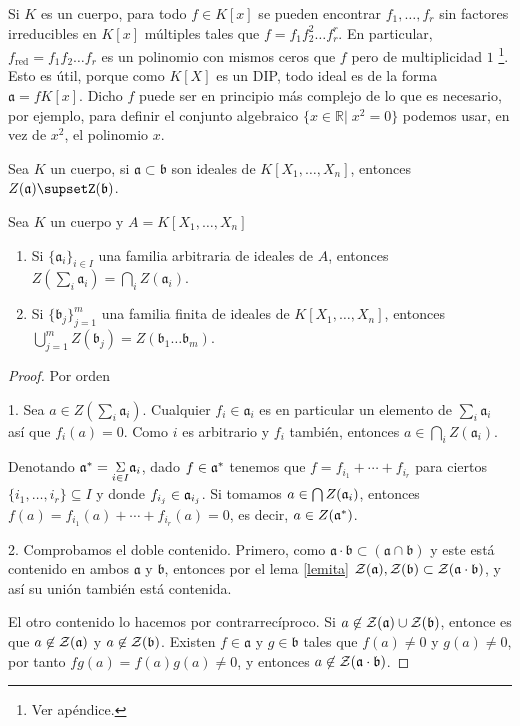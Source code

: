 \documentclass[./main.tex]{subfiles}
\begin{document}
Si $K$ es un cuerpo, para todo $f\in K[x]$ se pueden encontrar $f_1,\dots, f_r$ sin factores irreducibles en $K[x]$ múltiples tales que $f = f_1 f_2^2 \dots f_r^r$. En particular, $f_{\operatorname{red}} = f_1f_2 \dots f_r$ es un polinomio con mismos ceros que $f$ pero de multiplicidad $1$ \footnote{Ver apéndice.}. Esto es útil, porque como $K[X]$ es un DIP, todo ideal es de la forma $\mathfrak a = f K[x] $. Dicho $f$ puede ser en principio más complejo de lo que es necesario, por ejemplo, para definir el conjunto algebraico $\{x \in \mathbb R \vert \; x^2 = 0 \}$ podemos usar, en vez de $x^2$, el polinomio $x$.

\begin{lemma} \label{lemita}
Sea $K$ un cuerpo, si $\mathfrak{a}\subset \mathfrak b$ son ideales de $K[X_1,\dots, X_n]$, entonces $Z(\mathfrak{a}) \supsetZ (\mathfrak b)$.
\end{lemma}

\begin{proposition}
Sea $K$ un cuerpo y $A = K[X_1,\dots , X_n]$
\begin{enumerate}
    \item Si $\{\mathfrak a_i\}_{i\in I}$ una familia arbitraria de ideales de $A$, entonces $Z(\sum_i \mathfrak a_i) = \bigcap_i Z(\mathfrak a_i)$.
    \item Si $\{\mathfrak b_j\}_{j = 1}^m$ una familia finita de ideales de $K[X_1,\dots , X_n]$, entonces $\bigcup_{j=1}^m Z(\mathfrak b_j) = Z(\mathfrak b_1 \dots \mathfrak b_m)$.
\end{enumerate}
\end{proposition}
\begin{proof}
Por orden

1. Sea $a\in Z(\sum_i \mathfrak a_i)$. Cualquier $f_i \in \mathfrak a_i$ es en particular un elemento de $\sum_i \mathfrak a_i$ así que $f_i(a)  = 0$. Como $i$ es arbitrario y $f_i$ también, entonces $a \in \bigcap_i Z(\mathfrak a_i)$.

 Denotando $\mathfrak{a}^*=\underset{i\in I}{\Sigma}\mathfrak{a}_i$, dado $f\in\mathfrak{a}^*$ tenemos que $f=f_{i_1}+\cdots+f_{i_r}$ para ciertos $\{i_1,\dots,i_r\}\subseteq I$ y donde $f_{i_j}\in\mathfrak{a}_{i_j}$. Si tomamos $a\in\bigcap Z(\mathfrak{a}_i)$, entonces $f(a)=f_{i_1}(a)+\cdots+f_{i_r}(a)=0$, es decir, $a\in Z(\mathfrak{a}^*)$.



2. Comprobamos el doble contenido. Primero, como $\mathfrak a \cdot \mathfrak b \subset ( \mathfrak a \cap \mathfrak b )$ y este está contenido en ambos $\mathfrak a$ y $\mathfrak b$, entonces por el lema \ref{lemita} $\mathcal{Z}(\mathfrak a), \mathcal{Z}(\mathfrak b)\subset \mathcal{Z}(\mathfrak a \cdot \mathfrak b) $, y así su unión también está contenida.

El otro contenido lo hacemos por contrarrecíproco.  Si $a\not\in \mathcal{Z}(\mathfrak a)\cup \mathcal{Z}(\mathfrak b)$, entonce es que $a\not\in \mathcal{Z}( \mathfrak a)$ y $a\not\in \mathcal{Z}( \mathfrak b)$. Existen $f\in \mathfrak a$ y $g\in \mathfrak b$ tales que $f(a)\neq 0$ y $g(a) \neq 0$, por tanto $fg(a) = f(a)g(a) \neq 0$, y entonces $a\not\in \mathcal{Z}(\mathfrak a\cdot \mathfrak b)$.

\end{proof}
\end{document}
